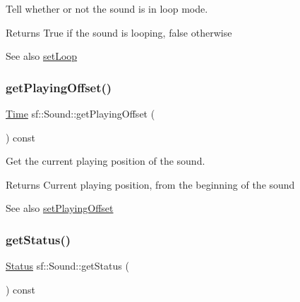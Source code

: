 Tell whether or not the sound is in loop mode. 

\begin{DoxyReturn}{Returns}
True if the sound is looping, false otherwise
\end{DoxyReturn}
\begin{DoxySeeAlso}{See also}
\hyperlink{classsf_1_1_sound_af23ab4f78f975bbabac031102321612b}{set\+Loop} 
\end{DoxySeeAlso}
\mbox{\label{classsf_1_1_sound_a559bc3aea581107bcb380fdbe523aa08}} 
\subsubsection{\texorpdfstring{get\+Playing\+Offset()}{getPlayingOffset()}}
{\footnotesize\ttfamily \hyperlink{classsf_1_1_time}{Time} sf\+::\+Sound\+::get\+Playing\+Offset (\begin{DoxyParamCaption}{ }\end{DoxyParamCaption}) const}



Get the current playing position of the sound. 

\begin{DoxyReturn}{Returns}
Current playing position, from the beginning of the sound
\end{DoxyReturn}
\begin{DoxySeeAlso}{See also}
\hyperlink{classsf_1_1_sound_ab905677846558042022dd6ab15cddff0}{set\+Playing\+Offset} 
\end{DoxySeeAlso}
\mbox{\label{classsf_1_1_sound_a406fc363594a7718a53ebef49a870f51}} 
\subsubsection{\texorpdfstring{get\+Status()}{getStatus()}}
{\footnotesize\ttfamily \hyperlink{classsf_1_1_sound_source_ac43af72c98c077500b239bc75b812f03}{Status} sf\+::\+Sound\+::get\+Status (\begin{DoxyParamCaption}{ }\end{DoxyParamCaption}) const}



